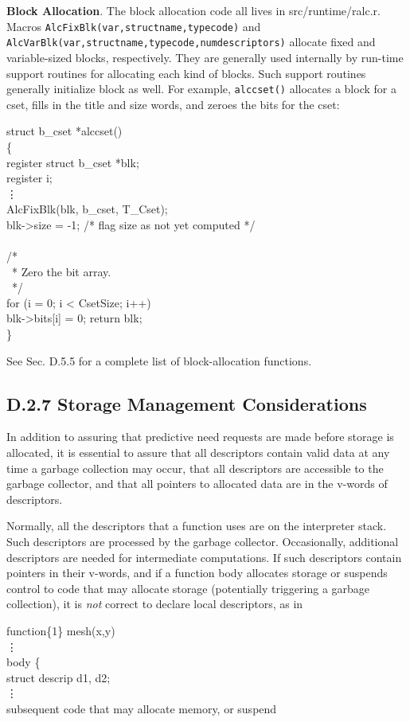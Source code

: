 \textbf{Block Allocation}. The block allocation code all lives in
src/runtime/ralc.r. Macros \texttt{AlcFixBlk(var,structname,typecode)}
and \texttt{AlcVarBlk(var,structname,typecode,numdescriptors)}
allocate fixed and variable-sized blocks, respectively. They are
generally used internally by run-time support routines for allocating
each kind of blocks.
Such support routines generally initialize block as well. For
example, \texttt{alccset()} allocates a block for a cset, fills in the
title and size words, and zeroes the bits for the cset:
\goodbreak
\begin{iconcode}
struct b\_cset *alccset()\\
\{\\
\>register struct b\_cset *blk;\\
\>register i;\\
\> \vdots \\
\>AlcFixBlk(blk, b\_cset, T\_Cset); \\
\>blk->size = -1; /* flag size as not yet computed */ \\
\\
\>/*\\
\>\ * Zero the bit array.\\
\>\ */\\
\>for (i = 0; i < CsetSize; i++)\\
\>\>blk->bits[i] = 0; return blk;\\
\}
\end{iconcode}

\noindent
See Sec. D.5.5 for a complete list of block-allocation functions.

\subsection%
           {D.2.7 Storage Management Considerations}

In addition to assuring that predictive need requests are made before
storage is allocated, it is essential to assure that all descriptors
contain valid data at any time a garbage collection may occur, that
all descriptors are accessible to the garbage collector, and that all
pointers to allocated data are in the v-words of descriptors.

Normally, all the descriptors that a function uses are on the interpreter
stack.  Such
descriptors are processed by the garbage collector. Occasionally,
additional descriptors are needed for intermediate computations. If such
descriptors contain pointers in their v-words, and if a function body
allocates storage or suspends control to code that may allocate
storage (potentially triggering a garbage collection), it is
\textit{not} correct to declare local descriptors, as in
\goodbreak
\begin{iconcode}
function\{1\} mesh(x,y)\\
\> \vdots \\
body \{\\
\>struct descrip d1, d2; \\
\> \vdots \\
\> subsequent code that may allocate memory, or suspend
\end{iconcode}

